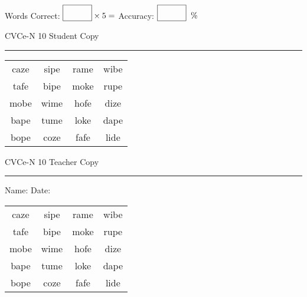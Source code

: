 \documentclass{memoir}
\begin{document}
\small

Words Correct: $\fbox{\phantom{\huge 100}} \times 5 = $ Accuracy: $\fbox{\phantom{\huge 100}}\;\; \%$ 

\vfill

\newpage


\footnotesize \noindent
CVCe-N 10 \hfill Student Copy
\smallskip
\hrule

\Large

\setlength{\tabcolsep}{14pt}
\def\arraystretch{2}

{\selectfont


\begin{vplace}[0.5]
\begin{center}
\begin{tabular}{cccc}
caze & sipe & rame & wibe \\
tafe & bipe & moke & rupe \\
mobe & wime & hofe & dize \\
bape & tume & loke & dape \\
bope & coze & fafe & lide \\
\end{tabular}
\end{center}
\end{vplace}

}

\newpage

\footnotesize \noindent
CVCe-N 10 \hfill Teacher Copy
\smallskip
\hrule

\small

\vfill

\noindent
Name: \underline{\hspace{1.75in}} \hfill Date: \underline{\hspace{1in}}

\Large

{\selectfont


\begin{vplace}[0.5]
\begin{center}
\begin{tabular}{cccc}
caze & sipe & rame & wibe \\
tafe & bipe & moke & rupe \\
mobe & wime & hofe & dize \\
bape & tume & loke & dape \\
bope & coze & fafe & lide \\
\end{tabular}
\end{center}
\end{vplace}



}
\end{document}
